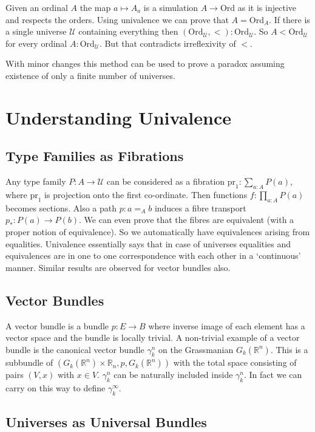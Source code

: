 \documentclass[10pt]{article}
\theoremstyle{definition}
\theoremstyle{plain}
\theoremstyle{remark}
\newcommand{\U}{\mathscr{U}}
\begin{document}
Given an ordinal $A$ the map $a \mapsto A_a$ is a simulation $A \to \text{Ord}$ as it is 
injective and respects the orders. Using univalence we can prove that $A = \text{Ord}_A$. 
If there is a single universe $\U$ containing everything then 
$(\text{Ord}_{\U},<) : \text{Ord}_{\U}$. So $A < \text{Ord}_{\U}$ for every ordinal 
$A : \text{Ord}_{\U}$. But that contradicts irreflexivity of $<$.\smallskip

With minor changes this method can be used to prove a paradox assuming existence of only a
finite number of universes. 

\section{Understanding Univalence}\label{S:UU}

\subsection{Type Families as Fibrations}
Any type family $P : A \to \U$ can be considered as a fibration 
${ \text{pr}_1 : \sum_{a : A} P(a) }$, where $\text{pr}_1$ is projection onto the first
co-ordinate. Then functions $f : \prod_{a : A} P(a)$ becomes sections. Also a path 
$p : a =_A b$ induces a fibre transport $p_* : P(a) \to P(b)$. We can even prove that the 
fibres are equivalent (with a proper notion of equivalence). So we automatically have 
equivalences arising from equalities. Univalence essentially says that in case of universes
equalities and equivalences are in one to one correspondence with each other in a `continuous'
manner. Similar results are observed for vector bundles also.

\subsection{Vector Bundles}
A vector bundle is a bundle $p : E \to B$ where inverse image of each element has a 
vector space and the bundle is locally trivial. A non-trivial example of a vector bundle is 
the canonical vector bundle $\gamma^n_k$ on the Grassmanian $G_k(\mathbb{R}^n)$. This is a 
subbundle of $(G_k(\mathbb{R}^n) \times \mathbb{R}_n,p,G_k(\mathbb{R}^n))$ with the total
space consisting of pairs $(V,x)$ with $x\in V$. $\gamma^n_k$ can be naturally included 
inside $\gamma^n_k$. In fact we can carry on this way to define $\gamma^{\infty}_k$. 

\subsection{Universes as Universal Bundles}
\end{document}
